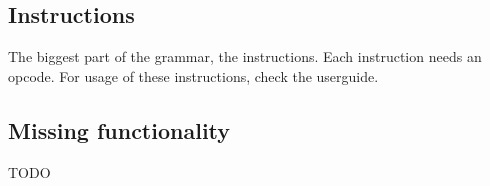 \subsection{Instructions}
The biggest part of the grammar, the instructions. Each instruction needs an opcode. For usage of these instructions, check the userguide.

\subsection{Missing functionality}
TODO